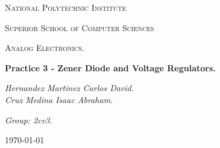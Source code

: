 \begin{titlepage}
	\centering
	{ \huge \scshape National Polytechnic Institute\par}
	{ \Large \scshape  Superior School of Computer Sciences\par }
	\vspace{1cm}
	{\scshape\Large Analog Electronics.\par}
	\vspace{1.5cm}
	{\Huge\bfseries Practice 3 - Zener Diode and Voltage Regulators.\par}
	\vspace{2cm}
	{\Large\itshape Hernandez Martinez Carlos David. \\ Cruz Medina Isaac Abraham. \par} \hfill \break
	{\Large\itshape Group: 2cv3. \par}
	\vfill
	{\large \today\par} 
	\vfill
\end{titlepage}


\tableofcontents 
{}
\pagebreak
